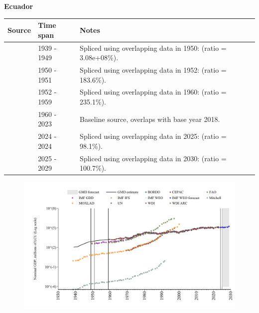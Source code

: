 \documentclass[12pt,a4paper,landscape]{article}
\begin{document}
\begin{adjustbox}{max totalsize={\paperwidth}{\paperheight},center}
\begin{minipage}[t][\textheight][t]{\textwidth}
\vspace*{0.5cm}
{}
\begin{center}
{\Large\bfseries Ecuador}
\end{center}
\vspace{0.5cm}
\begin{table}[H]
\centering
\small
\begin{tabular}{|l|l|l|}
\hline
\textbf{Source} & \textbf{Time span} & \textbf{Notes} \\
\hline
\rowcolor{white}\cite{Mitchell}& 1939 - 1949 &Spliced using overlapping data in 1950: (ratio = 3.08e+08\%).\\
\rowcolor{lightgray}\cite{IMF_IFS}& 1950 - 1951 &Spliced using overlapping data in 1952: (ratio = 183.6\%).\\
\rowcolor{white}\cite{IMF_GDD}& 1952 - 1959 &Spliced using overlapping data in 1960: (ratio = 235.1\%).\\
\rowcolor{lightgray}\cite{WDI}& 1960 - 2023 &Baseline source, overlaps with base year 2018.\\
\rowcolor{white}\cite{IMF_IFS}& 2024 - 2024 &Spliced using overlapping data in 2025: (ratio = 98.1\%).\\
\rowcolor{lightgray}\cite{IMF_WEO_forecast}& 2025 - 2029 &Spliced using overlapping data in 2030: (ratio = 100.7\%).\\
\hline
\end{tabular}
\end{table}
\begin{figure}[H]
\centering
\includegraphics[width=\textwidth,height=0.6\textheight,keepaspectratio]{graphs/ECU_nGDP.pdf}
\end{figure}
\end{minipage}
\end{adjustbox}
\end{document}
